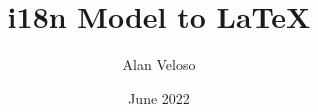 \title{i18n Model to \LaTeX}
\author{Alan Veloso}
\date{June 2022}

\maketitle

\begin{abstract}
\lipsum[1-1]
\end{abstract}

